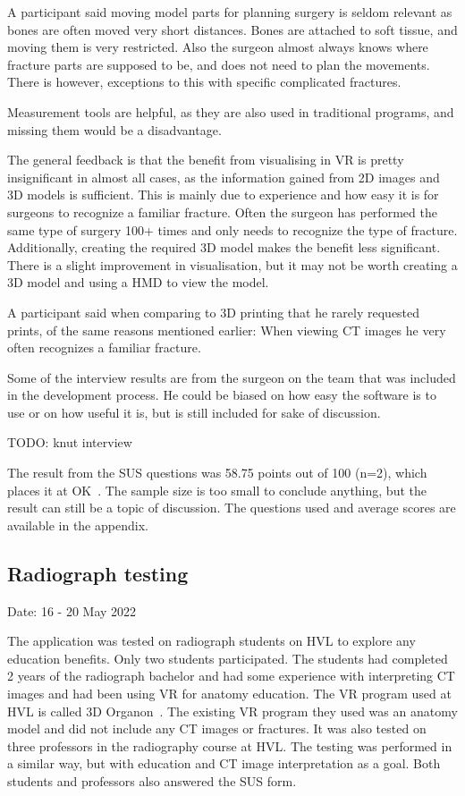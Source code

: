 \documentclass[a4paper]{report}
\begin{document}
A participant said moving model parts for planning surgery is seldom relevant as bones are often moved very short distances. Bones are attached to soft tissue, and moving them is very restricted.
Also the surgeon almost always knows where fracture parts are supposed to be, and does not need to plan the movements. There is however, exceptions to this with specific complicated fractures.

Measurement tools are helpful, as they are also used in traditional programs, and missing them would be a disadvantage.

The general feedback is that the benefit from visualising in VR is pretty insignificant in almost all cases, as the information gained from 2D images and 3D models is sufficient.
This is mainly due to experience and how easy it is for surgeons to recognize a familiar fracture. Often the surgeon has performed the same type of surgery 100+ times and only needs to recognize the type of fracture. Additionally, creating the required 3D model makes the benefit less significant.
There is a slight improvement in visualisation, but it may not be worth creating a 3D model and using a HMD to view the model.

A participant said when comparing to 3D printing that he rarely requested prints, of the same reasons mentioned earlier: When viewing CT images he very often recognizes a familiar fracture.

Some of the interview results are from the surgeon on the team that was included in the development process. He could be biased on how easy the software is to use or on how useful it is, but is still included for sake of discussion.

TODO: knut interview

The result from the SUS questions was 58.75 points out of 100 (n=2), which places it at OK~\cite{bangor_empirical_2008}. The sample size is too small to conclude anything, but the result can still be a topic of discussion. The questions used and average scores are available in the appendix.

\subsection{Radiograph testing}
Date: 16 - 20 May 2022

The application was tested on radiograph students on HVL to explore any education benefits. Only two students participated. The students had completed 2 years of the radiograph bachelor and had some experience with interpreting CT images and had been using VR for anatomy education. The VR program used at HVL is called 3D Organon~\cite{organon}.
The existing VR program they used was an anatomy model and did not include any CT images or fractures.
It was also tested on three professors in the radiography course at HVL.
The testing was performed in a similar way, but with education and CT image interpretation as a goal.
Both students and professors also answered the SUS form.
\end{document}
